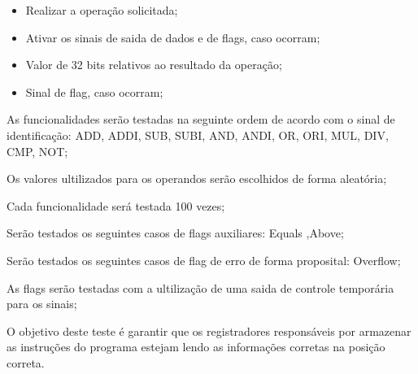 \documentclass{article}
\begin{document}
  \actions
  \begin{itemize}
     \item Realizar a operação solicitada;
     \item Ativar os sinais de saida de dados e de flags, caso ocorram;
    \end{itemize}
  
  \results
  	\begin{itemize}
     \item Valor de 32 bits relativos ao resultado da operação;
     \item Sinal de flag, caso ocorram;
    \end{itemize}
  
  \begin{mainflow}
    \item As funcionalidades serão testadas na seguinte ordem de acordo com o sinal de identificação: ADD, ADDI, SUB, SUBI,
AND, ANDI, OR, ORI, MUL, DIV, CMP, NOT;
    \item Os valores ultilizados para os operandos serão escolhidos de forma aleatória;
    \item Cada funcionalidade será testada 100 vezes;
    \item Serão testados os seguintes casos de flags auxiliares: Equals ,Above;
    \item Serão testados os seguintes casos de flag de erro de forma proposital: Overflow;
    \item As flags serão testadas com a ultilização de uma saida de controle temporária para os sinais;
  \end{mainflow}
  
  
  
  
O objetivo deste teste é garantir que os registradores responsáveis por armazenar as instruções do programa  estejam lendo as informações corretas na posição correta.
  
\end{document}
